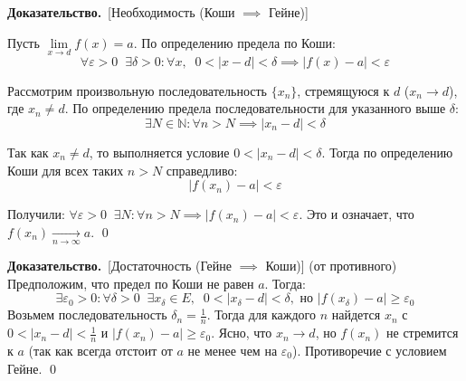 \documentclass[a4paper,12pt]{article}
\newcommand{\myproof}{\textbf{Доказательство.}\ }
\begin{document}
	\vspace{0.5cm}
	\myproof[Необходимость (Коши $\implies$ Гейне)]
	
	Пусть $\lim\limits_{x \to d} f(x) = a$. По определению предела по Коши:
	\[ \forall \varepsilon > 0 \;\; \exists \delta > 0 \colon \forall x, \;\; 0 < |x - d| < \delta \implies |f(x) - a| < \varepsilon \]
	
	Рассмотрим произвольную последовательность $\{x_n\}$, стремящуюся к $d$ ($x_n \to d$), где $x_n \neq d$. По определению предела последовательности для указанного выше $\delta$:
	\[ \exists N \in \mathbb{N} \colon \forall n > N \implies |x_n - d| < \delta \]
	
	Так как $x_n \neq d$, то выполняется условие $0 < |x_n - d| < \delta$. Тогда по определению Коши для всех таких $n > N$ справедливо:
	\[ |f(x_n) - a| < \varepsilon \]
	
	Получили: $\forall \varepsilon > 0 \;\; \exists N \colon \forall n > N \implies |f(x_n) - a| < \varepsilon$.
	Это и означает, что $f(x_n) \xrightarrow[n \to \infty]{} a$. \qed
	
	\vspace{1cm}
	\myproof[Достаточность (Гейне $\implies$ Коши)] (от противного)
	Предположим, что предел по Коши не равен $a$. Тогда:
	\[ \exists \varepsilon_0 > 0 \colon \forall \delta > 0 \;\; \exists x_\delta \in E, \;\; 0 < |x_\delta - d| < \delta, \text{ но } |f(x_\delta) - a| \ge \varepsilon_0 \]
	Возьмем последовательность $\delta_n = \frac{1}{n}$. Тогда для каждого $n$ найдется $x_n$ с $0 < |x_n - d| < \frac{1}{n}$ и $|f(x_n) - a| \ge \varepsilon_0$.
	Ясно, что $x_n \to d$, но $f(x_n)$ не стремится к $a$ (так как всегда отстоит от $a$ не менее чем на $\varepsilon_0$). Противоречие с условием Гейне. \qed
		
\end{document}
